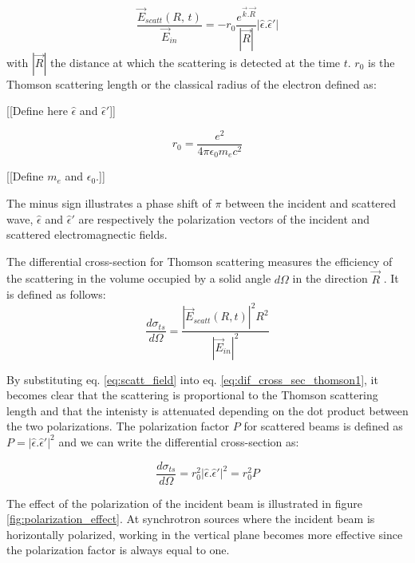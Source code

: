 \begin{equation}
    \label{eq:scatt_field}
    \frac{\vec{E}_{scatt}(R, \, t)} {\vec{E}_{in}} = -r_0 \frac{e^{\vec{k}.\vec{R}}} {|\vec{R}|}| \hat{\epsilon}.\hat{\epsilon}'|
\end{equation}
with $|\vec{R}|$ the distance at which the scattering is detected at the time $t$. $r_0$ is the Thomson scattering length {\color{DarkOrange}or the classical radius of the electron} defined as:

{\color{DarkOrange}[[Define here $\hat{\epsilon}$ and $\hat{\epsilon}'$]]}


\begin{equation}
    \label{eq:scatt_thomson_scat_length}
    r_0 = \frac{e^2} {4\pi\epsilon_0 m_e c^2}
\end{equation}

{\color{DarkOrange}[[Define $m_e$ and $\epsilon_0$.]]}

The minus sign illustrates a phase shift of $\pi$ between the incident and scattered wave, $\hat{\epsilon}$ and $\hat{\epsilon}'$ are respectively the polarization vectors of the incident and scattered electromagnectic fields.

The differential cross-section for Thomson scattering measures the efficiency of the scattering in the volume occupied by a solid angle $d\Omega$ in the direction $\vec{R}$ \parencite{NielsenMcMorrow}. It is defined as follows:
\begin{equation}
    \label{eq:dif_cross_sec_thomson1}
    \frac{d\sigma_{ts}} {d \Omega} = \frac{ |\vec{E}_{scatt}(R, t)|^2 R^2} {|\vec{E}_{in}|^2}
\end{equation}

By substituting eq. \ref{eq:scatt_field} into eq. \ref{eq:dif_cross_sec_thomson1}, it becomes clear that the scattering is proportional to the Thomson scattering length and that the intenisty is attenuated depending on the dot product between the two polarizations.
The polarization factor $P$ for scattered beams is defined as $P =  | \hat{\epsilon}.\hat{\epsilon}'|^2$ and we can write the differential cross-section as:

\begin{equation}
    \frac{d\sigma_{ts}} {d \Omega} = r_0^2 | \hat{\epsilon}.\hat{\epsilon}'|^2 = r_0^2 P
\end{equation}

The effect of the polarization of the incident beam is illustrated in figure \ref{fig:polarization_effect}.
At synchrotron sources where the incident beam is horizontally polarized, working in the vertical plane becomes more effective since the polarization factor is always equal to one.

